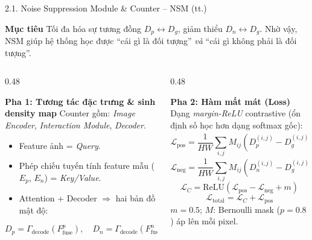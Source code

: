 \documentclass[11pt]{beamer}
\begin{document}
\begin{frame}[shrink=10]{2.1. Noise Suppression Module \& Counter -- NSM (tt.)}
\scriptsize

\begin{block}{\textbf{Mục tiêu}}
Tối đa hóa sự tương đồng $D_p \leftrightarrow D_g$, giảm thiểu $D_n \leftrightarrow D_g$. Nhờ vậy, NSM giúp hệ thống học được ``cái gì là đối tượng'' \emph{và} ``cái gì không phải là đối tượng''.
\end{block}

\vspace{0.3em}

\begin{columns}[T,onlytextwidth]
\begin{column}{0.48\textwidth}

\begin{block}{\textbf{Pha 1: Tương tác đặc trưng \& sinh density map}}
Counter gồm: \textit{Image Encoder}, \textit{Interaction Module}, \textit{Decoder}.
\begin{itemize}
  \item Feature ảnh = \textit{Query}.
  \item Phép chiếu tuyến tính feature mẫu ($E_p$, $E_n$) = \textit{Key/Value}.
  \item Attention + Decoder $\Rightarrow$ hai bản đồ mật độ:
\end{itemize}
\vspace{-0.3em}
\[
D_p = \Gamma_{\text{decode}}(F^p_{\text{fuse}}), \quad
D_n = \Gamma_{\text{decode}}(F^n_{\text{fuse}})
\]
\end{block}

\end{column}

\begin{column}{0.48\textwidth}

\begin{block}{\textbf{Pha 2: Hàm mất mát (Loss)}}
Dạng \emph{margin-ReLU} contrastive (ổn định số học hơn dạng softmax gốc):
\vspace{-0.3em}
\[
\mathcal{L}_{\text{pos}} = \frac{1}{HW}\sum_{i,j} M_{ij}(D^{(i,j)}_p - D^{(i,j)}_g)^2
\]
\[
\mathcal{L}_{\text{neg}} = \frac{1}{HW}\sum_{i,j} M_{ij}(D^{(i,j)}_n - D^{(i,j)}_g)^2
\]
\[
\mathcal{L}_{C} = \mathrm{ReLU}(\mathcal{L}_{\text{pos}} - \mathcal{L}_{\text{neg}} + m)
\]
\[
\mathcal{L}_{\text{total}} = \mathcal{L}_{C} + \mathcal{L}_{\text{pos}}
\]
{\tiny $m=0.5$; $M$: Bernoulli mask ($p=0.8$) áp lên mỗi pixel.}
\end{block}


\end{column}
\end{columns}
\end{frame}
\end{document}
